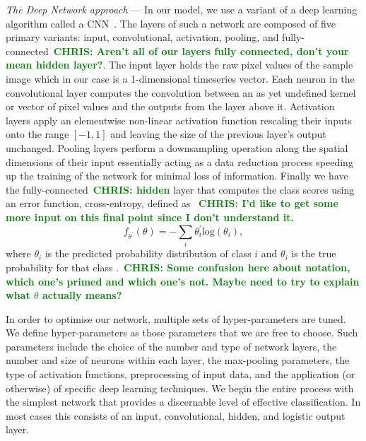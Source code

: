 \documentclass[%
 amsmath,amssymb,
 aps,
 twocolumn,
 prl,
 reprint,
floatfix,
]{revtex4-1}
\newcommand{\chris}[1]{\textbf{\textcolor{green}{CHRIS: #1}}}
\begin{document}
%
% 
\textit{The Deep Network approach} --- 
%
%
In our model, we use a variant of a deep learning algorithm called a
\ac{CNN}~\cite{726791}. The layers of such a network are composed of five
primary variants: input, convolutional, activation, pooling, and
fully-connected~\chris{Aren't all of our layers fully connected, don't your
mean hidden layer?}. The input layer holds the raw pixel values of the sample
image which in our case is a 1-dimensional timeseries vector.  Each neuron in
the convolutional layer computes the convolution between an as yet undefined
kernel or vector of pixel values and the outputs from the layer above it.
Activation layers apply an elementwise non-linear activation function rescaling
their inputs onto the range $[-1,1]$ and leaving the size of the previous
layer's output unchanged. Pooling layers perform a downsampling operation along
the spatial dimensions of their input essentially acting as a data reduction
process speeding up the training of the network for minimal loss of
information. Finally we have the fully-connected~\chris{hidden} layer that
computes the class scores using an error function, cross-entropy, defined as
~\chris{I'd like to get some more input on this final point since I don't
understand it.}
%
%
\begin{equation} \label{eq:loss}
f_{\theta^{'}}(\theta) = -\sum_{i} \theta_{i}^{'} \mathrm{log}(\theta_{i}),
\end{equation}
%
where $\theta_{i}$ is the predicted probability distribution of class $i$ and
$\theta_{i}$ is the true probability for that class
\cite{tensorflow2015-whitepaper}.~\chris{Some confusion here about notation,
which one's primed and which one's not. Maybe need to try to explain what
$\theta$ actually means?} 

%
%
In order to optimise our network, multiple sets of hyper-parameters are
tuned. We define hyper-parameters as those parameters that we are free to
choose. Such parameters include the choice of the number and type of network
layers, the number and size of neurons within each layer, the max-pooling
parameters, the type of activation functions, preprocessing of input data, and
the application (or otherwise) of specific deep learning techniques. We begin
the entire process with the simplest network that provides a discernable level
of effective classification. In most cases this consists of an input,
convolutional, hidden, and logistic output layer.
\end{document}
